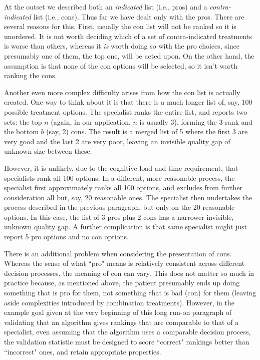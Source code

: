 \documentclass{article}
\begin{document}
At the outset we described both an \emph{indicated} list (i.e., pros) and a \emph{contra-indicated} list (i.e., cons). Thus far we have dealt only with the pros. There are several reasons for this. First, usually the con list will not be ranked so it is unordered. It is not worth deciding which of a set of contra-indicated treatments is worse than others, whereas it \textit{is} worth doing so with the pro choices, since presumably one of them, the top one, will be acted upon. On the other hand, the assumption is that none of the con options will be selected, so it isn't worth ranking the cons. 

Another even more complex difficulty arises from how the con list is actually created. One way to think about it is that there is a much longer list of, say, 100  possible treatment options. The specialist ranks the entire list, and reports two sets: the top $n$ (again, in our application, $n$ is usually 3), forming the 3-rank and the bottom $b$ (say, 2) cons. The result is a merged list of 5 where the first 3 are very good and the last 2 are very poor, leaving an invisible quality gap of unknown size between these. 

However, it is unlikely, due to the cognitive load and time requirement, that specialists rank all 100 options. In a different, more reasonable process, the specialist first approximately ranks all 100 options, and excludes from further consideration all but, say, 20 reasonable ones. The specialist then undertakes the process described in the previous paragraph, but only on the 20  reasonable options. In this case, the list of 3 pros plus 2 cons has a narrower invisible, unknown quality gap. A further complication is that same specialist might just report 5 pro options and no con options. 

There is an additional problem when considering the presentation of cons. Whereas the sense of what ``pro" means is relatively consistent across different decision processes, the meaning of con can vary. This does not matter so much in practice because, as mentioned above, the patient presumably ends up doing something that is pro for them, not something that is bad (con) for them (leaving aside complexities introduced by combination treatments). However, in the example goal given at the very beginning of this long run-on paragraph of validating that an algorithm gives rankings that are comparable to that of a specialist, even assuming that the algorithm uses a comparable decision process, the validation statistic must be designed to score ``correct" rankings better than ``incorrect" ones, and retain appropriate properties. 
\end{document}

